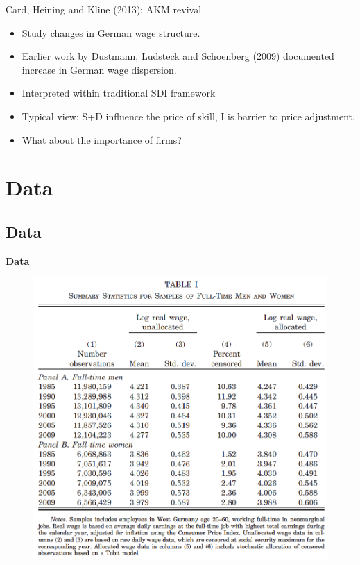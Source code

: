 \documentclass[notes=show]{beamer}
\begin{document}
\begin{frame}{Card, Heining and Kline (2013): AKM revival}
\begin{itemize}
    \item Study changes in German wage structure. \medskip
    \item Earlier work by Dustmann, Ludsteck and Schoenberg (2009) documented increase in German wage dispersion. \medskip
    \item Interpreted within traditional SDI framework \medskip
    \item Typical view: S+D influence the price of skill, I is barrier to price adjustment. \medskip
    \item What about the importance of firms? \medskip
\end{itemize}
\end{frame}

\section{Data}

\subsection*{Data}

\begin{frame}
	\centering
	\textbf{Data}
\end{frame}

\begin{frame}
\begin{figure}[p!]
	\begin{adjustbox}
        \includegraphics[width=.85\textwidth]{figures/Table1} 
 	\end{adjustbox}
\end{figure}
\end{frame}
\end{document}
